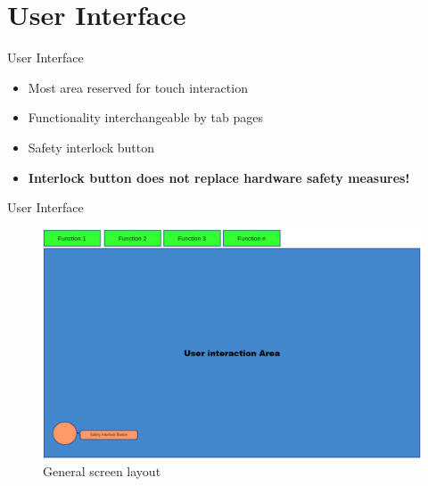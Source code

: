 \documentclass[t]{beamer}
\begin{document}
\section{User Interface}

\begin{frame}{User Interface}
\begin{itemize}
	\item Most area reserved for touch interaction
	\item Functionality interchangeable by tab pages
	\item Safety interlock button
	\item \textbf{Interlock button does not replace hardware safety measures!}
\end{itemize}
\end{frame}

\begin{frame}{User Interface}
\begin{figure}
	\includegraphics[width=0.8\linewidth]{assets/chpt_concepts/main_touch_interface.png}
	\caption{General screen layout}
\end{figure}
\end{frame}
\end{document}
